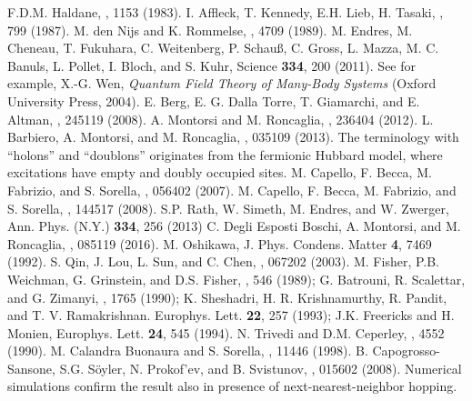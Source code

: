\documentclass[aps,prb,floatfix,twocolumn,amsmath,amssymb]{revtex4}
\begin{document}
\begin{thebibliography}{}
 F.D.M. Haldane, , 1153 (1983).
 I. Affleck, T. Kennedy, E.H. Lieb, H. Tasaki, , 799 (1987).
 M. den Nijs and K. Rommelse, , 4709 (1989).
 M. Endres, M. Cheneau, T. Fukuhara, C. Weitenberg, P. Schau\ss, C. Gross, L. Mazza, M. C. Banuls, L. Pollet, 
   I. Bloch, and S. Kuhr, Science {\bf 334}, 200 (2011).
 See for example, X.-G. Wen, {\it Quantum Field Theory of Many-Body Systems} (Oxford University Press, 2004).
 E. Berg, E. G. Dalla Torre, T. Giamarchi, and E. Altman, , 245119 (2008).
 A. Montorsi and M. Roncaglia, , 236404 (2012).
 L. Barbiero, A. Montorsi, and M. Roncaglia, , 035109 (2013).
 The terminology with ``holons'' and ``doublons'' originates from the fermionic Hubbard model, where excitations 
   have empty and doubly occupied sites.
 M. Capello, F. Becca, M. Fabrizio, and S. Sorella, , 056402 (2007).
 M. Capello, F. Becca, M. Fabrizio, and S. Sorella, , 144517 (2008).
 S.P. Rath, W. Simeth, M. Endres, and W. Zwerger, Ann. Phys. (N.Y.) {\bf 334}, 256 (2013)
 C. Degli Esposti Boschi, A. Montorsi, and M. Roncaglia, , 085119 (2016).
 M. Oshikawa, J. Phys. Condens. Matter {\bf 4}, 7469 (1992).
 S. Qin, J. Lou, L. Sun, and C. Chen, , 067202 (2003).
 M. Fisher, P.B. Weichman, G. Grinstein, and D.S. Fisher, , 546 (1989); 
   G. Batrouni, R. Scalettar, and G. Zimanyi, , 1765 (1990); 
   K. Sheshadri, H. R. Krishnamurthy, R. Pandit, and T. V. Ramakrishnan. Europhys. Lett. {\bf 22}, 257 (1993);
   J.K. Freericks and H. Monien, Europhys. Lett. {\bf 24}, 545 (1994).
 N. Trivedi and D.M. Ceperley, , 4552 (1990).
 M. Calandra Buonaura and S. Sorella, , 11446 (1998).
 B. Capogrosso-Sansone, S.G. S\"oyler, N. Prokof'ev, and B. Svistunov, , 
   015602 (2008).
 Numerical simulations confirm the result also in presence of next-nearest-neighbor hopping.
\end{thebibliography}
\end{document}
